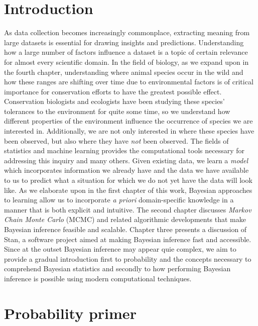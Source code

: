 \documentclass[
  12pt,
  twoside]{book}
\theoremstyle{definition}
\theoremstyle{definition}
\theoremstyle{definition}
\theoremstyle{remark}
\begin{document}
\hypertarget{introduction}{%
\chapter*{Introduction}\label{introduction}}

As data collection becomes increasingly commonplace, extracting meaning from large datasets is essential for drawing insights and predictions.
Understanding how a large number of factors influence a dataset is a topic of certain relevance for almost every scientific domain.
In the field of biology, as we expand upon in the fourth chapter, understanding where animal species occur in the wild and how these ranges are shifting over time due to environmental factors is of critical importance for conservation efforts to have the greatest possible effect.
Conservation biologists and ecologists have been studying these species' tolerances to the environment for quite some time, so we understand how different properties of the environment influence the occurrence of species we are interested in.
Additionally, we are not only interested in where these species have been observed, but also where they have \emph{not} been observed.
The fields of statistics and machine learning provides the computational tools necessary for addressing this inquiry and many others.
Given existing data, we learn a \emph{model} which incorporates information we already have and the data we have available to us to predict what a situation for which we do not yet have the data will look like.
As we elaborate upon in the first chapter of this work, Bayesian approaches to learning allow us to incorporate \emph{a priori} domain-specific knowledge in a manner that is both explicit and intuitive.
The second chapter discusses \emph{Markov Chain Monte Carlo} (MCMC) and related algorithmic developments that make Bayesian inference feasible and scalable.
Chapter three presents a discussion of Stan, a software project aimed at making Bayesian inference fast and accessible.
Since at the outset Bayesian inference may appear quie complex, we aim to provide a gradual introduction first to probability and the concepts necessary to comprehend Bayesian statistics and secondly to how performing Bayesian inference is possible using modern computational techniques.

\hypertarget{probability-primer}{%
\chapter{Probability primer}\label{probability-primer}}
\end{document}
